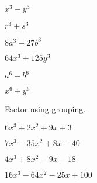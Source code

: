 \documentclass{report}
\theoremstyle{definition}
\begin{document}
\begin{enumerate}
\setcounter{enumi}{4}
	\begin{minipage}[t]{0.45\linewidth}
	\item $x^3-y^3$ \\
	
	\vspace{3cm}
	\item $r^3+s^3$\\
	
	\vspace{3cm}
	\item $8a^3-27b^3$\\
	
	\vspace{3cm}	
	\end{minipage}
	\hfill
	\begin{minipage}[t]{0.45\linewidth}
	\item $64x^3+125y^3$\\
	
	\vspace{3cm}
	\item $a^6-b^6$\\
	
	\vspace{3cm}
	\item $x^6+y^6$\\
	
	\vspace{3cm}
	\end{minipage}
\end{enumerate}

\noindent Factor using grouping.\\

\begin{enumerate}
\setcounter{enumi}{4}
	\begin{minipage}[t]{0.45\linewidth}
	\item $6x^3+2x^2+9x+3$ \\
	
	\vspace{3cm}
	\item $7x^3-35x^2+8x-40$\\
	
	\vspace{3cm}	
	\end{minipage}
	\hfill
	\begin{minipage}[t]{0.45\linewidth}
	\item $4x^3+8x^2-9x-18$\\
	
	\vspace{3cm}
	\item $16x^3-64x^2-25x+100$\\
	
	\vspace{3cm}
	\end{minipage}
\end{enumerate}
\end{document}

